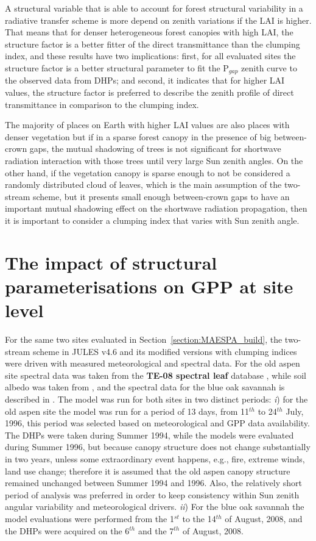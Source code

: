 \documentclass[a4paper,11pt]{report}
\begin{document}
A structural variable that is able to account for forest structural variability in a radiative transfer scheme is more depend on zenith variations if the LAI is higher. That means that for denser heterogeneous forest canopies with high LAI, the structure factor is a better fitter of the direct transmittance than the clumping index, and these results have two implications: first, for all evaluated sites the structure factor is a better structural parameter to fit the P$_{gap}$ zenith curve to the observed data from DHPs; and second, it indicates that for higher LAI values, the structure factor is preferred to describe the zenith profile of direct transmittance in comparison to the clumping index.

The majority of places on Earth with higher LAI values are also places with denser vegetation but if in a sparse forest canopy in the presence of big between-crown gaps, the mutual shadowing of trees is not significant for shortwave radiation interaction with those trees until very large Sun zenith angles. On the other hand, if the vegetation canopy is sparse enough to not be considered a randomly distributed cloud of leaves, which is the main assumption of the two-stream scheme, but it presents  small enough between-crown gaps to have an important mutual shadowing effect on the shortwave radiation propagation, then it is important to consider a clumping index that varies with Sun zenith angle.

\section{The impact of structural parameterisations on GPP at site level}\label{section:gpp_evaluations}

For the same two sites evaluated in Section~\ref{section:MAESPA_build}, the two-stream scheme in JULES v4.6 and its modified versions with clumping indices were driven with measured meteorological and spectral data. For the old aspen site spectral data was taken from the \textbf{TE-08 spectral leaf} database \citep{Spencer1999}, while soil albedo was taken from \citet{Betts1997}, and the spectral data for the blue oak savannah is described in \citet{Kobayashi2012}. The model was run for both sites in two distinct periods: \textit{i}) for the old aspen site the model was run for a period of 13 days, from 11$^{th}$ to 24$^{th}$ July, 1996, this period was selected based on meteorological and GPP data availability. The DHPs were taken during Summer 1994, while the models were evaluated during Summer 1996, but because canopy structure does not change substantially in two years, unless some extraordinary event happens, e.g., fire, extreme winds, land use change; therefore it is assumed that the old aspen canopy structure remained unchanged between Summer 1994 and 1996. Also, the relatively short period of analysis was preferred in order to keep consistency within Sun zenith angular variability and meteorological drivers. \textit{ii}) For the blue oak savannah the model evaluations were performed from the 1$^{st}$ to the 14$^{th}$ of August, 2008, and the DHPs were acquired on the 6$^{th}$ and the 7$^{th}$ of August, 2008.
\end{document}
